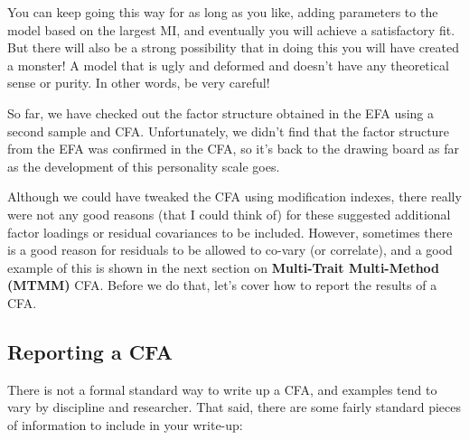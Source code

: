 \documentclass[
]{book}
\begin{document}
You can keep going this way for as long as you like, adding parameters to the model based on the largest MI, and eventually you will achieve a satisfactory fit. But there will also be a strong possibility that in doing this you will have created a monster! A model that is ugly and deformed and doesn't have any theoretical sense or purity. In other words, be very careful!

So far, we have checked out the factor structure obtained in the EFA using a second sample and CFA. Unfortunately, we didn't find that the factor structure from the EFA was confirmed in the CFA, so it's back to the drawing board as far as the development of this personality scale goes.

Although we could have tweaked the CFA using modification indexes, there really were not any good reasons (that I could think of) for these suggested additional factor loadings or residual covariances to be included. However, sometimes there is a good reason for residuals to be allowed to co-vary (or correlate), and a good example of this is shown in the next section on {\textbf{Multi-Trait Multi-Method (MTMM)}} CFA. Before we do that, let's cover how to report the results of a CFA.

\hypertarget{reporting-a-cfa}{%
\subsection{Reporting a CFA}\label{reporting-a-cfa}}

There is not a formal standard way to write up a CFA, and examples tend to vary by discipline and researcher. That said, there are some fairly standard pieces of information to include in your write-up:
\end{document}
